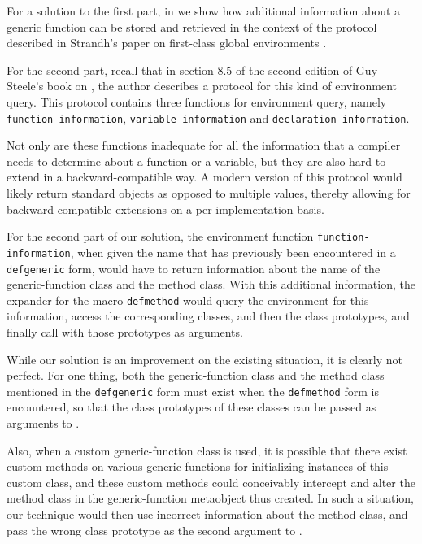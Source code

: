 For a solution to the first part, in  we show how
additional information about a generic function can be stored and
retrieved in the context of the protocol described in Strandh's paper
on first-class global environments
\cite{Strandh:2015:ELS:Environments}.

For the second part, recall that in section 8.5 of the second edition
of Guy Steele's book on \commonlisp{} \cite{Steele:1990:CLL:95411},
the author describes a protocol for this kind of environment query.
This protocol contains three functions for environment query, namely
\texttt{function-information}, \texttt{variable-information} and
  \texttt{declaration-information}.

Not only are these functions inadequate for all the information that a
compiler needs to determine about a function or a variable, but they
are also hard to extend in a backward-compatible way.  A modern
version of this protocol would likely return standard objects as
opposed to multiple values, thereby allowing for backward-compatible
extensions on a per-implementation basis.

For the second part of our solution, the environment function
\texttt{function-information}, when given the name that has previously
been encountered in a \texttt{defgeneric} form, would have to return
information about the name of the generic-function class and the
method class.  With this additional information, the expander for the
macro \texttt{defmethod} would query the environment for this
information, access the corresponding classes, and then the class
prototypes, and finally call \mml{} with those prototypes as
arguments.

While our solution is an improvement on the existing situation, it is
clearly not perfect.  For one thing, both the generic-function class
and the method class mentioned in the \texttt{defgeneric} form must
exist when the \texttt{defmethod} form is encountered, so that the
class prototypes of these classes can be passed as arguments to \mml{}.

Also, when a custom generic-function class is used, it is possible
that there exist custom methods on various generic functions for
initializing instances of this custom class, and these custom methods
could conceivably intercept and alter the method class in the
generic-function metaobject thus created.  In such a situation, our
technique would then use incorrect information about the method class,
and pass the wrong class prototype as the second argument to \mml{}.
